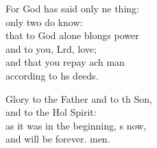 \begin{psalmverse}
\begin{patverse}
For God has said only ne thing:\Med\\
only two do  know:\\
that to God alone blongs power\Med\\
and to you, Lrd, love;\\
and that you repay ach man\Med\\
according to h\pointup{\i}s deeds.

Glory to the Father and to th Son,\Med\\
and to the Hol Spirit:\\
as it was in the beginning, \pointup{\i}s now,\Med\\
and will be forever. men. 
  \end{patverse}
\end{psalmverse}
